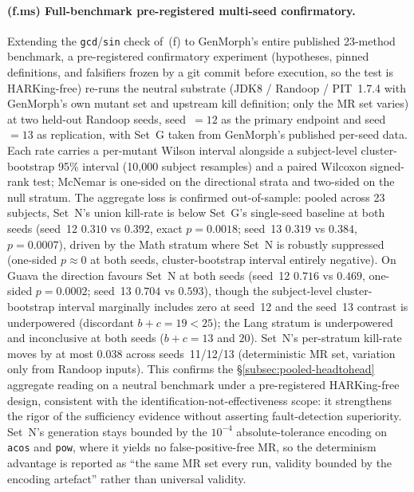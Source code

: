 \documentclass[manuscript]{acmart}
\begin{document}
\paragraph{(f.ms) Full-benchmark pre-registered multi-seed confirmatory.}
Extending the \texttt{gcd}/\texttt{sin} check of~(f) to GenMorph's entire published 23-method benchmark, a pre-registered confirmatory experiment (hypotheses, pinned definitions, and falsifiers frozen by a git commit before execution, so the test is HARKing-free) re-runs the neutral substrate (JDK8 / Randoop / PIT~1.7.4 with GenMorph's own mutant set and upstream kill definition; only the MR set varies) at two held-out Randoop seeds, seed~$=12$ as the primary endpoint and seed~$=13$ as replication, with Set~G taken from GenMorph's published per-seed data. Each rate carries a per-mutant Wilson interval alongside a subject-level cluster-bootstrap 95\% interval (10{,}000 subject resamples) and a paired Wilcoxon signed-rank test; McNemar is one-sided on the directional strata and two-sided on the null stratum. The aggregate loss is confirmed out-of-sample: pooled across 23 subjects, Set~N's union kill-rate is below Set~G's single-seed baseline at both seeds (seed~12 $0.310$ vs $0.392$, exact $p = 0.0018$; seed~13 $0.319$ vs $0.384$, $p = 0.0007$), driven by the Math stratum where Set~N is robustly suppressed (one-sided $p \approx 0$ at both seeds, cluster-bootstrap interval entirely negative). On Guava the direction favours Set~N at both seeds (seed~12 $0.716$ vs $0.469$, one-sided $p = 0.0002$; seed~13 $0.704$ vs $0.593$), though the subject-level cluster-bootstrap interval marginally includes zero at seed~12 and the seed~13 contrast is underpowered (discordant $b+c = 19 < 25$); the Lang stratum is underpowered and inconclusive at both seeds ($b+c = 13$ and $20$). Set~N's per-stratum kill-rate moves by at most $0.038$ across seeds~11/12/13 (deterministic MR set, variation only from Randoop inputs). This confirms the \S\ref{subsec:pooled-headtohead} aggregate reading on a neutral benchmark under a pre-registered HARKing-free design, consistent with the identification-not-effectiveness scope: it strengthens the rigor of the sufficiency evidence without asserting fault-detection superiority. Set~N's generation stays bounded by the $10^{-4}$ absolute-tolerance encoding on \texttt{acos} and \texttt{pow}, where it yields no false-positive-free MR, so the determinism advantage is reported as ``the same MR set every run, validity bounded by the encoding artefact'' rather than universal validity.
\end{document}
